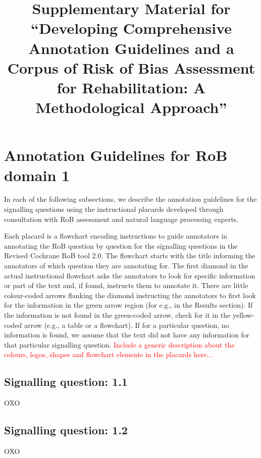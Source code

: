\documentclass[sn-mathphys,Numbered]{sn-jnl}%
\begin{document}
\title[Article Title]{Supplementary Material for ``Developing Comprehensive Annotation Guidelines and a Corpus of Risk of Bias Assessment for Rehabilitation: A Methodological Approach''}



\maketitle


\section*{Annotation Guidelines for RoB domain 1}
\label{sec:dom1}
%
In each of the following subsections, we describe the annotation guidelines for the signalling questions using the instructional placards developed through consultation with RoB assessment and natural language processing experts.

Each placard is a flowchart encoding instructions to guide annotators in annotating the RoB question by question for the signalling questions in the Revised Cochrane RoB tool 2.0.
The flowchart starts with the title informing the annotators of which question they are annotating for.
The first diamond in the actual instructional flowchart asks the annotators to look for specific information or part of the text and, if found, instructs them to annotate it.
There are little colour-coded arrows flanking the diamond instructing the annotators to first look for the information in the green arrow region (for e.g., in the Results section). 
If the information is not found in the green-coded arrow, check for it in the yellow-coded arrow (e.g., a table or a flowchart).
If for a particular question, no information is found, we assume that the text did not have any information for that particular signalling question.
\textcolor{red}{Include a generic description about the colours, logos, shapes and flowchart elements in the placards here...}
%
%
%
\subsection*{Signalling question: 1.1}
%
OXO
%
%
%
\subsection*{Signalling question: 1.2}
%
OXO
%
%
%
\end{document}
